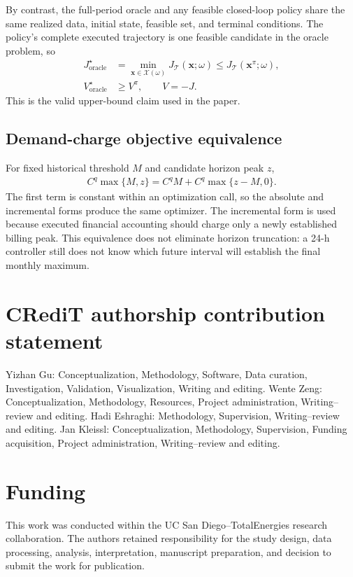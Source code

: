 \documentclass[final,5p,times]{elsarticle}
\newcommand{\calT}{\mathcal{T}}
\begin{document}
By contrast, the full-period oracle and any feasible closed-loop policy share
the same realized data, initial state, feasible set, and terminal conditions.
The policy's complete executed trajectory is one feasible candidate in the
oracle problem, so
\begin{align}
J_{\mathrm{oracle}}^\star
&=\min_{\boldsymbol{x}\in\mathcal{X}(\omega)}J_{\calT}(\boldsymbol{x};\omega)
\le J_{\calT}(\boldsymbol{x}^{\pi};\omega), \label{eq:app_oracle_cost_proof}\\
V_{\mathrm{oracle}}^\star&\ge V^\pi,\qquad V=-J. \label{eq:app_oracle_value_proof}
\end{align}
This is the valid upper-bound claim used in the paper.

\subsection{Demand-charge objective equivalence}
For fixed historical threshold $M$ and candidate horizon peak $z$,
\begin{align}
C^q\max\{M,z\}
=C^qM+C^q\max\{z-M,0\}. \label{eq:app_demand_equivalence}
\end{align}
The first term is constant within an optimization call, so the absolute and incremental
forms produce the same optimizer. The incremental form is used because executed
financial accounting should charge only a newly established billing peak. This
equivalence does not eliminate horizon truncation: a 24-h controller still does
not know which future interval will establish the final monthly maximum.

\section*{CRediT authorship contribution statement}
Yizhan Gu: Conceptualization, Methodology, Software, Data curation, Investigation, Validation, Visualization, Writing and editing. Wente Zeng: Conceptualization, Methodology, Resources, Project administration, Writing--review and editing. Hadi Eshraghi: Methodology, Supervision, Writing--review and editing. Jan Kleissl: Conceptualization,
Methodology, Supervision, Funding acquisition, Project administration, Writing--review and editing.

\section*{Funding}
This work was conducted within the UC San Diego--TotalEnergies research
collaboration. The authors retained responsibility for the study design, data
processing, analysis, interpretation, manuscript preparation, and decision to
submit the work for publication.
\end{document}
